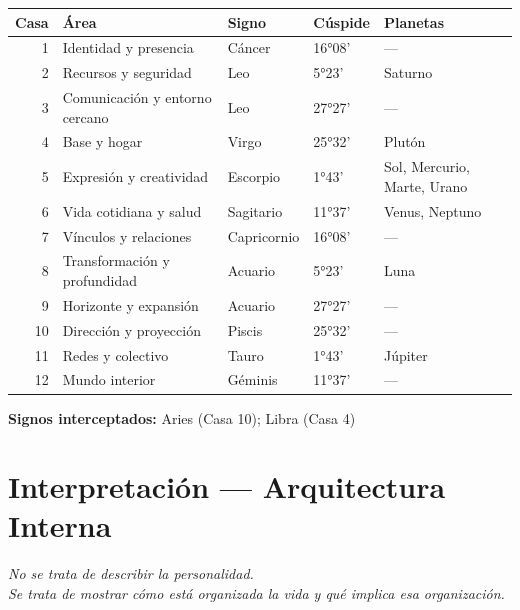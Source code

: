 \documentclass[11pt,a4paper]{article}
\begin{document}
\begin{center}
\begin{tabular}{rllll}
  \toprule
  \textbf{Casa} & \textbf{Área} & \textbf{Signo} & \textbf{Cúspide} & \textbf{Planetas} \\
  \midrule
  1 & Identidad y presencia & Cáncer & 16°08' & — \\
  2 & Recursos y seguridad & Leo & 5°23' & Saturno \\
  3 & Comunicación y entorno cercano & Leo & 27°27' & — \\
  4 & Base y hogar & Virgo & 25°32' & Plutón \\
  5 & Expresión y creatividad & Escorpio & 1°43' & Sol, Mercurio, Marte, Urano \\
  6 & Vida cotidiana y salud & Sagitario & 11°37' & Venus, Neptuno \\
  7 & Vínculos y relaciones & Capricornio & 16°08' & — \\
  8 & Transformación y profundidad & Acuario & 5°23' & Luna \\
  9 & Horizonte y expansión & Acuario & 27°27' & — \\
  10 & Dirección y proyección & Piscis & 25°32' & — \\
  11 & Redes y colectivo & Tauro & 1°43' & Júpiter \\
  12 & Mundo interior & Géminis & 11°37' & — \\
  \bottomrule
\end{tabular}
\end{center}

\vspace{0.3cm}\textbf{Signos interceptados:} Aries (Casa 10); Libra (Casa 4)

\newpage

\section{Interpretación — Arquitectura Interna}

\begin{center}
{\small\itshape
No se trata de describir la personalidad.\\ Se trata de mostrar cómo está organizada la vida y qué implica esa organización.
}
\end{center}

\vspace{0.5cm}
\end{document}
